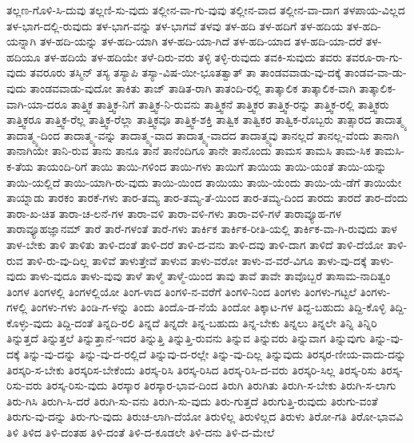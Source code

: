 {ತಲ್ಲಣ-ಗೊಳಿ-ಸಿ-ದುವು
ತಲ್ಲಣಿ-ಸು-ವುದು
ತಲ್ಲೀನ-ವಾ-ಗು-ವುವು
ತಲ್ಲೀನ-ವಾದ
ತಲ್ಲೀನ-ವಾ-ದಾಗ
ತಳಪಾಯ-ವಿಲ್ಲದ
ತಳ-ಭಾಗ-ದಲ್ಲಿ-ರುವುದು
ತಳ-ಭಾಗ-ವನ್ನು
ತಳ-ಭಾಗವೆ
ತಳವು
ತಳ-ಹದಿ
ತಳ-ಹದಿಗೆ
ತಳ-ಹದಿಯ
ತಳ-ಹದಿ-ಯನ್ನಾಗಿ
ತಳ-ಹದಿ-ಯನ್ನು
ತಳ-ಹದಿ-ಯಾಗಿ
ತಳ-ಹದಿ-ಯಾ-ಗಿದೆ
ತಳ-ಹದಿ-ಯಾದ
ತಳ-ಹದಿ-ಯಾ-ದರೆ
ತಳ-ಹದಿಯೂ
ತಳ-ಹದಿಯೆ
ತಳ-ಹದಿಯೇ
ತಳೆ-ದಿರು-ವರು
ತಳ್ಳಿ
ತಳ್ಳಿ-ರುವುದು
ತವಕಿ-ಸುವುದು
ತವರು
ತವರೂ-ರಾ-ಗು-ವುದು
ತವರೂರು
ತಸ್ಮಿನ್
ತಸ್ಯ
ತಸ್ಯಾಪಿ
ತಸ್ಯಾ-ವಿಷ-ಯೀ-ಭೂತತ್ವಾತ್
ತಾ
ತಾಂಡವವಾಡು-ವು-ದಕ್ಕೆ
ತಾಂಡವ-ವಾ-ಡು-ವುದು
ತಾಂಡವವಾಡು-ವುದೋ
ತಾಕಿತು
ತಾಜ್
ತಾಡಿತ-ರಾಗಿ
ತಾತಂದಿ-ರಲ್ಲಿ
ತಾತ್ಕಾಲಿಕ
ತಾತ್ಕಾಲಿಕ-ವಾಗಿ
ತಾತ್ಕಾಲಿಕ-ವಾಗಿ-ಯಾ-ದರೂ
ತಾತ್ತ್ವಿಕ
ತಾತ್ತ್ವಿಕ-ನಿಗೆ
ತಾತ್ತ್ವಿಕ-ನಿ-ರುವನು
ತಾತ್ತ್ವಿಕನೆ
ತಾತ್ತ್ವಿಕರ
ತಾತ್ತ್ವಿಕ-ರನ್ನು
ತಾತ್ತ್ವಿಕ-ರಲ್ಲಿ
ತಾತ್ತ್ವಿಕರು
ತಾತ್ತ್ವಿಕರೂ
ತಾತ್ತ್ವಿಕ-ರೆಲ್ಲ
ತಾತ್ತ್ವಿಕ-ರೆಲ್ಲಾ
ತಾತ್ತ್ವಿಕವೂ
ತಾತ್ತ್ವಿಕ-ಶಕ್ತಿ
ತಾತ್ವಿಕ
ತಾತ್ವಿಕರ
ತಾತ್ವಿಕ-ರೊಬ್ಬರು
ತಾತ್ಸಾರದ
ತಾದಾತ್ಮ್ಯ
ತಾದಾತ್ಮ್ಯ-ದಿಂದ
ತಾದಾತ್ಮ್ಯ-ವನ್ನು
ತಾದಾತ್ಮ್ಯ-ವಾದ
ತಾದಾತ್ಮ್ಯ-ವಾದದ
ತಾದಾತ್ಮ್ಯವು
ತಾನಲ್ಲದೆ
ತಾನಲ್ಲ-ವೆಂದು
ತಾನಾಗಿ
ತಾನಾಗಿಯೇ
ತಾನಿ-ರುವ
ತಾನು
ತಾನೂ
ತಾನೆ
ತಾನೆಂದಿಗೂ
ತಾನೇ
ತಾನೊಂದು
ತಾಮಸ
ತಾಮಸಿ
ತಾಮ-ಸಿಕ
ತಾಮಸಿ-ಕ-ತೆಯ
ತಾಯಂದಿ-ರಿಗೆ
ತಾಯಿ
ತಾಯಿ-ಗಳಿಂದ
ತಾಯಿ-ಗಳು
ತಾಯಿಗೆ
ತಾಯಿಯ
ತಾಯಿ-ಯಂತೆ
ತಾಯಿ-ಯನ್ನು
ತಾಯಿ-ಯಲ್ಲಿದೆ
ತಾಯಿ-ಯಾಗಿ-ರು-ವುದು
ತಾಯಿ-ಯಿಂದ
ತಾಯಿಯು
ತಾಯಿ-ಯೆಂದು
ತಾಯಿ-ಯೆ-ಡೆಗೆ
ತಾಯಿಯೇ
ತಾಯ್ನಾಡು
ತಾರಕಂ
ತಾರಕೆ-ಗಳು
ತಾರ-ತಮ್ಯ
ತಾರ-ತಮ್ಯ-ತೆ-ಯಿಂದ
ತಾರ-ತಮ್ಯ-ದಿಂದ
ತಾರದು
ತಾರದೆ
ತಾರ-ದೆಂದು
ತಾರಾ-ಖ-ಚಿತ
ತಾರಾ-ಚ-ಲನೆ-ಗಳ
ತಾರಾ-ವಳಿ
ತಾರಾ-ವಳಿ-ಗಳು
ತಾರಾ-ವಳಿ-ಗಳೆ
ತಾರಾವ್ಯೂಹ-ಗಳ
ತಾರಾವ್ಯೂಹಜ್ಞಾನಮ್
ತಾರೆ
ತಾರೆ-ಗಳಂತೆ
ತಾರೆ-ಗಳು
ತಾರ್ಕಿಕ
ತಾರ್ಕಿಕ-ರೀತಿ-ಯಲ್ಲಿ
ತಾರ್ಕಿಕ-ವಾ-ಗಿ-ರುವುದು
ತಾಳ
ತಾಳ-ಬೇಕು
ತಾಳಿ
ತಾಳಿತು
ತಾಳಿ-ದಂತೆ
ತಾಳಿ-ದರೆ
ತಾಳಿ-ದ-ವನು
ತಾಳಿ-ದವು
ತಾಳಿ-ದಾಗ
ತಾಳಿದೆ
ತಾಳಿ-ದೆಯೋ
ತಾಳಿ-ರುವ
ತಾಳಿ-ರು-ವು-ದಿಲ್ಲ
ತಾಳಿವೆ
ತಾಳುತ್ತೇವೆ
ತಾಳುವ
ತಾಳು-ವರೋ
ತಾಳು-ವ-ವರೆ-ವಿಗೂ
ತಾಳು-ವು-ದಕ್ಕೆ
ತಾಳು-ವುದು
ತಾಳು-ವುದೂ
ತಾಳು-ವುವು
ತಾಳೆ
ತಾಳ್ಮೆ
ತಾಳ್ಮೆ-ಯಿಂದ
ತಾವು
ತಾವೆ
ತಾವೇ
ತಾವೊಬ್ಬರೆ
ತಾಸಾಮ-ನಾದಿತ್ವಂ
ತಿಂಗಳ
ತಿಂಗಳಲ್ಲಿ
ತಿಂಗಳಲ್ಲಿಯೋ
ತಿಂಗ-ಳಾದ
ತಿಂಗಳಿ-ನ-ವರೆಗೆ
ತಿಂಗಳಿ-ನಿಂದ
ತಿಂಗಳು
ತಿಂಗಳು-ಗಟ್ಟಲೆ
ತಿಂಗಳು-ಗಳಲ್ಲಿ
ತಿಂಗಳು-ಗಳು
ತಿಂಡಿ-ಗ-ಳನ್ನು
ತಿಂದು
ತಿಂದೊ-ಡ-ನೆಯೆ
ತಿಂದೋ
ತಿಕ್ಕಾಟ-ಗಳ
ತಿದ್ದ-ಬಹುದು
ತಿದ್ದಿ-ಕೊಳ್ಳಿ
ತಿದ್ದಿ-ಕೊಳ್ಳು-ವುದು
ತಿದ್ದಿ-ದಂತೆ
ತಿನ್ನದಿ-ರಲಿ
ತಿನ್ನದೆ
ತಿನ್ನದೇ
ತಿನ್ನ-ಬಹುದು
ತಿನ್ನ-ಬೇಕು
ತಿನ್ನಲು
ತಿನ್ನಲೇ
ತಿನ್ನಿ
ತಿನ್ನಿರಿ
ತಿನ್ನುತ್ತದೆ
ತಿನ್ನುತ್ತಲೆ
ತಿನ್ನುತ್ತಾನೆ-ಇದರ
ತಿನ್ನುತ್ತಿ
ತಿನ್ನುತ್ತಿ-ರುವನು
ತಿನ್ನುವ
ತಿನ್ನುವರು
ತಿನ್ನುವಾಗ
ತಿನ್ನುವುಗು
ತಿನ್ನು-ವು-ದಕ್ಕೆ
ತಿನ್ನು-ವು-ದನ್ನು
ತಿನ್ನು-ವು-ದ-ರಲ್ಲಿದೆ
ತಿನ್ನುವು-ದ-ರಲ್ಲೇ
ತಿನ್ನು-ವು-ದಿಲ್ಲ
ತಿನ್ನುವುದು
ತಿರಸ್ಕರ-ಣೀಯ-ವಾದು-ದನ್ನು
ತಿರಸ್ಕರಿ-ಸ-ಬೇಕು
ತಿರಸ್ಕರಿಸ-ಬೇಕೆಂದು
ತಿರಸ್ಕ-ರಿಸಿ
ತಿರಸ್ಕ-ರಿಸಿದ
ತಿರಸ್ಕ-ರಿಸಿ-ದ-ವರು
ತಿರಸ್ಕರಿ-ಸಿಲ್ಲ
ತಿರಸ್ಕ-ರಿಸು
ತಿರಸ್ಕ-ರಿಸು-ವರು
ತಿರಸ್ಕ-ರಿಸು-ವುದು
ತಿರಸ್ಕಾರ
ತಿರಸ್ಕಾರ-ಭಾವ-ದಿಂದ
ತಿರುಗಿ
ತಿರುಗಿತು
ತಿರುಗಿ-ಸ-ಬೇಕು
ತಿರುಗಿ-ಸ-ಲಾಗು
ತಿರು-ಗಿಸಿ
ತಿರುಗಿ-ಸಿ-ದರೆ
ತಿರುಗಿ-ಸು-ವನು
ತಿರುಗಿ-ಸು-ವುದು
ತಿರು-ಗುತ್ತದೆ
ತಿರುಗುತ್ತಿ-ರುವುದು
ತಿರುಗು-ವಂತೆ
ತಿರುಗು-ವು-ದನ್ನು
ತಿರು-ಗು-ವುದು
ತಿರುಚ-ಲಾಗಿ-ದೆಯೋ
ತಿರುಳಿಲ್ಲ
ತಿರುಳಿಲ್ಲದ
ತಿರುಳು
ತಿರೋ-ಗತಿ
ತಿರೋ-ಭಾವವಿ
ತಿಳಿ
ತಿಳಿದ
ತಿಳಿ-ದಂತಹ
ತಿಳಿ-ದಂತೆ
ತಿಳಿ-ದ-ಕೂಡಲೇ
ತಿಳಿ-ದನು
ತಿಳಿ-ದ-ಮೇಲೆ
}

